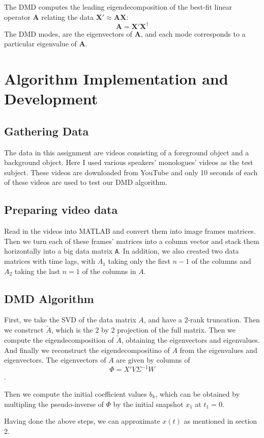 \documentclass[12pt, a4paper]{article}
\begin{document}
The DMD computes the leading eigendecomposition of the best-fit linear operator $\mathbf{A}$ relating the data $\mathbf{X}' \approx \mathbf{AX}$:
$$\mathbf{A} = \mathbf{X'X^\dagger}$$
The DMD modes, are the eigenvectors of $\mathbf{A}$, and each mode corresponds to a particular eigenvalue of $\mathbf{A}$.

\section{Algorithm Implementation and Development}
\subsection{Gathering Data}
The data in this assignment are videos consisting of a foreground object and a background object. Here I used various speakers' monologues' videos as the test subject. These videos are downloaded from YouTube and only 10 seconds of each of these videos are used to test our DMD algorithm.

\subsection{Preparing video data}
Read in the videos into MATLAB and convert them into image frames matrices. Then we turn each of these frames' matrices into a column vector and stack them horizontally into a big data matrix \texttt{A}. In addition, we also created two data matrices with time lags, with $A_1$ taking only the first $n - 1$ of the columns and $A_2$ taking the last $n = 1$ of the columns in $A$.

\subsection{DMD Algorithm}
First, we take the SVD of the data matrix $A$, and have a 2-rank truncation. Then we construct $\tilde{A}$, which is the 2 by 2 projection of the full matrix. Then we compute the eigendecomposition of $\tilde{A}$, obtaining the eigenvectors and eigenvalues. And finally we reconstruct the eigendecompositino of $A$ from the eigenvalues and eigenvectors. The eigenvectors of $A$ are given by columns of 
$$\Phi = X'V\Sigma^{-1}W$$.

Then we compute the initial coefficient values $b_k$, which can be obtained by multipling the pseudo-inverse of $\Phi$ by the initial snapshot $x_1$ at $t_1 = 0$.

Having done the above steps, we can approximate $x(t)$ as mentioned in section 2.
\end{document}
